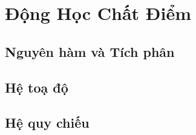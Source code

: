   
\chapter{Động Học Chất Điểm }


\section{Nguyên hàm và Tích phân}

\section{Hệ toạ độ}

\section{Hệ quy chiếu}


\begin{refsection}
  \nocite{savelyev,pfiev1,calculusjame,engineeringHob,morin2008introduction}
  \printbibliography
\end{refsection}